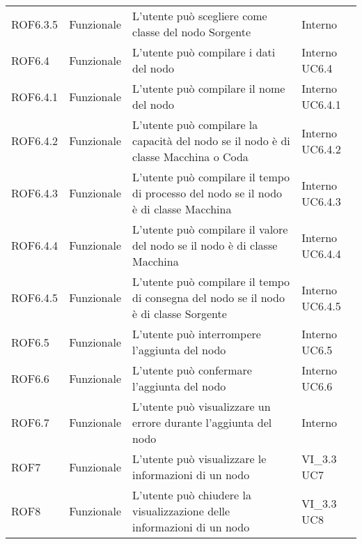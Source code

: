 \begin{longtable}{p{2cm}!{\VRule[1pt]}p{2cm}!{\VRule[1pt]}p{5cm}!{\VRule[1pt]}p{1.5cm}}
ROF6.3.5&Funzionale\newline  & L'utente può scegliere come classe del nodo Sorgente & Interno \\
ROF6.4&Funzionale\newline  & L'utente può compilare i dati del nodo & Interno \newline UC6.4
\\
ROF6.4.1&Funzionale\newline  & L'utente può compilare il nome del nodo & Interno \newline UC6.4.1
\\
ROF6.4.2&Funzionale\newline  & L'utente può compilare la capacità del nodo se il nodo è di classe Macchina o Coda & Interno \newline UC6.4.2
\\
ROF6.4.3&Funzionale\newline  & L'utente può compilare il tempo di processo del nodo se il nodo è di classe Macchina & Interno \newline UC6.4.3
\\
ROF6.4.4&Funzionale\newline  & L'utente può compilare il valore del nodo se il nodo è di classe Macchina & Interno \newline UC6.4.4
\\
ROF6.4.5&Funzionale\newline  & L'utente può compilare il tempo di consegna del nodo se il nodo è di classe Sorgente & Interno \newline UC6.4.5
\\
ROF6.5&Funzionale\newline  & L'utente può interrompere l'aggiunta del nodo & Interno \newline UC6.5
\\
ROF6.6&Funzionale\newline  & L'utente può confermare l'aggiunta del nodo & Interno \newline UC6.6
\\
ROF6.7&Funzionale\newline  & L'utente può visualizzare un errore durante l'aggiunta del nodo & Interno \\
ROF7&Funzionale\newline  & L'utente può visualizzare le informazioni di un nodo & VI_3.3 \newline UC7
\\
ROF8&Funzionale\newline  & L'utente può chiudere la visualizzazione delle informazioni di un nodo & VI_3.3 \newline UC8

\end{longtable}
